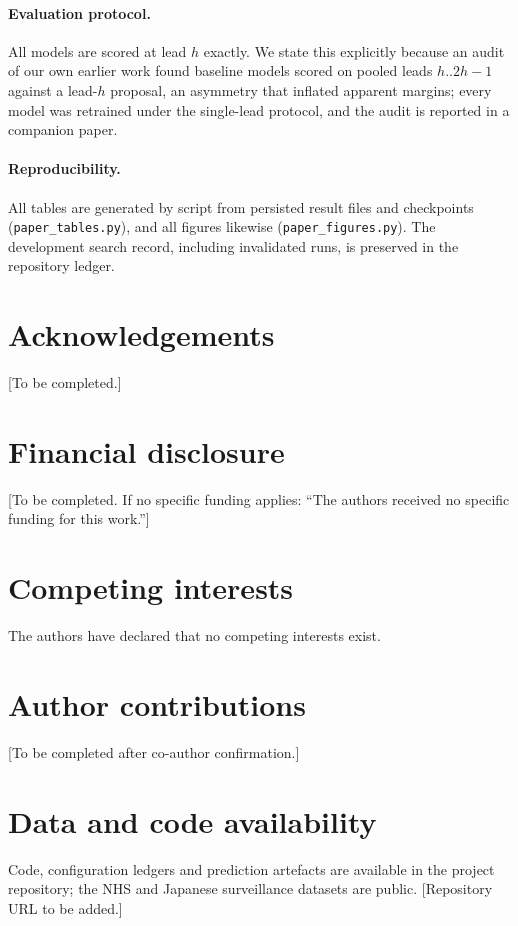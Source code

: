 \documentclass[10pt,letterpaper]{article}
\begin{document}
\paragraph{Evaluation protocol.} All models are scored at lead $h$ exactly.
We state this explicitly because an audit of our own earlier work found
baseline models scored on pooled leads $h..2h{-}1$ against a lead-$h$
proposal, an asymmetry that inflated apparent margins; every model was
retrained under the single-lead protocol, and the audit is reported in a
companion paper.

\paragraph{Reproducibility.} All tables are generated by script from
persisted result files and checkpoints (\texttt{paper\_tables.py}), and all
figures likewise (\texttt{paper\_figures.py}). The development search
record, including invalidated runs, is preserved in the repository ledger.

\section*{Acknowledgements}
[To be completed.]

\section*{Financial disclosure}
[To be completed. If no specific funding applies: ``The authors received no
specific funding for this work.'']

\section*{Competing interests}
The authors have declared that no competing interests exist.

\section*{Author contributions}
[To be completed after co-author confirmation.]

\section*{Data and code availability}
Code, configuration ledgers and prediction artefacts are available in the
project repository; the NHS and Japanese surveillance datasets are public.
[Repository URL to be added.]


\end{document}
